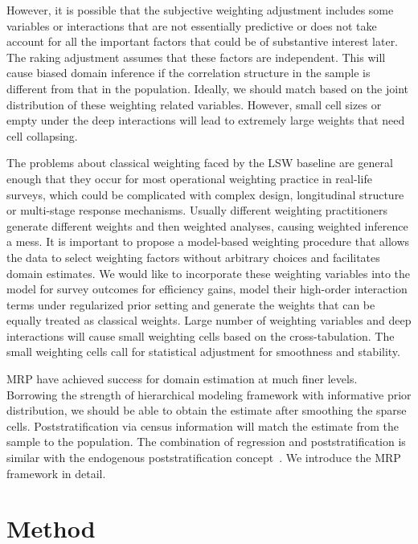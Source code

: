 \documentclass[11pt]{article}
\begin{document}
However, it is possible that the subjective weighting adjustment includes some variables or interactions that are not essentially predictive or does not take account for all the important factors that could be of substantive interest later. The raking adjustment assumes that these factors are independent. This will cause biased domain inference if the correlation structure in the sample is different from that in the population. Ideally, we should match based on the joint distribution of these weighting related variables. However, small cell sizes or empty under the deep interactions will lead to extremely large weights that need cell collapsing. 
	
	The problems about classical weighting faced by the LSW baseline are general enough that they occur for most operational weighting practice in real-life surveys, which could be complicated with complex design, longitudinal structure or multi-stage response mechanisms. Usually different weighting practitioners generate different weights and then weighted analyses, causing weighted inference a mess. It is important to propose a model-based weighting procedure that allows the data to select weighting factors without arbitrary choices and facilitates domain estimates. We would like to incorporate these weighting variables into the model for survey outcomes for efficiency gains, model their high-order interaction terms under regularized prior setting and generate the weights that can be equally treated as classical weights. Large number of weighting variables and deep interactions will cause small weighting cells based on the cross-tabulation. The small weighting cells call for statistical adjustment for smoothness and stability. 
		
	MRP have achieved success for domain estimation at much finer levels. Borrowing the strength of hierarchical modeling framework with informative prior distribution, we should be able to obtain the estimate after smoothing the sparse cells. Poststratification via census information will match the estimate from the sample to the population. The combination of regression and poststratification is similar with the endogenous poststratification concept~\citep{Breidt08,Dahlke13}. We introduce the MRP framework in detail.
	

	
\section{Method}
\label{method}
\end{document}
